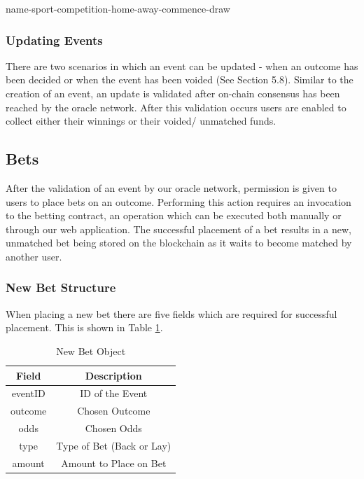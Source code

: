 \documentclass{article}
\begin{document}
\begin{center}
name-sport-competition-home-away-commence-draw
\end{center}

		\subsubsection{Updating Events}
There are two scenarios in which an event can be updated - when an outcome has been decided or when the event has been voided (See Section 5.8). Similar to the creation of an event, an update is validated after on-chain consensus has been reached by the oracle network. After this validation occurs users are enabled to collect either their winnings or their voided/ unmatched funds.

	\subsection{Bets}
	After the validation of an event by our oracle network, permission is given to users to place bets on an outcome. Performing this action requires an invocation to the betting contract, an operation which can be executed both manually or through our web application. The successful placement of a bet results in a new, unmatched bet being stored on the blockchain as it waits to become matched by another user.

		\subsubsection{New Bet Structure}
When placing a new bet there are five fields which are required for successful placement. This is shown in Table \ref{table:bets}.

\begin{table}[!htb]
\centering
\caption{New Bet Object}

\begin{tabular}{ c c }
\bfseries{Field} & \bfseries{Description} \\
\hline

eventID & ID of the Event \\
\hline
outcome & Chosen Outcome \\
\hline
odds & Chosen Odds \\
\hline
type & Type of Bet (Back or Lay) \\
\hline
amount & Amount to Place on Bet \\
\hline

\end{tabular}
\label{table:bets}
\end{table}
\end{document}
